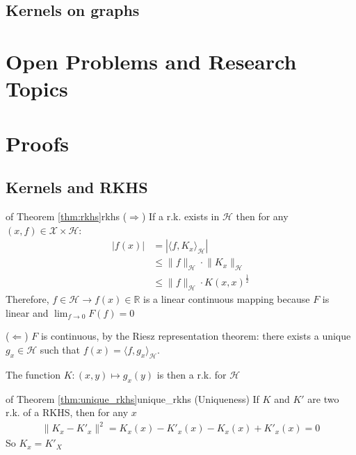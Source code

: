 \documentclass[10pt]{article}
\begin{document}
\subsection{Kernels on graphs}

\section{Open Problems and Research Topics}



\appendix

\section{Proofs}

\subsection{Kernels and RKHS}

\begin{Proof}{of Theorem \ref{thm:rkhs}}{rkhs}
  ($\Rightarrow$) If a r.k. exists in $\mathcal{H}$ then for any $(x,f) \in 
  \mathcal{X} \times \mathcal{H}$:
  \begin{align*}
    |f(x)| &= |\langle f, K_x \rangle_\mathcal{H} |\\
           &\leq \lVert f \rVert_\mathcal{H} \cdot \lVert K_x \rVert_\mathcal{H}
           \tag{Cauchy-Schwarz}\\
           &\leq \lVert f \rVert_\mathcal{H} \cdot K(x,x)^\frac{1}{2}
  \end{align*}
  Therefore, $f\in\mathcal{H} \rightarrow f(x) \in \mathbb{R}$ is a linear 
  continuous mapping because $F$ is linear and $\lim_{f\rightarrow 0} F(f)= 0$

  \vspace{10pt}
  ($\Leftarrow$) $F$ is continuous, by the Riesz representation theorem: there
  exists a unique $g_x \in \mathcal{H}$ such that $f(x) = \langle f, g_x 
  \rangle_\mathcal{H}$.

  The function $K: (x, y) \mapsto g_x(y)$ is then a r.k. for $\mathcal{H}$
\end{Proof}

\begin{Proof}{of Theorem \ref{thm:unique_rkhs}}{unique_rkhs}
  (Uniqueness) If $K$ and $K'$ are two r.k. of a RKHS, then for any $x$
  \begin{align*}
    \lVert K_x - K'_x\rVert^2 = K_x(x) - K'_x(x) - K_x(x) + K'_x(x) = 0
  \end{align*}
  So $K_x = K'_X$

\end{Proof}
\end{document}
